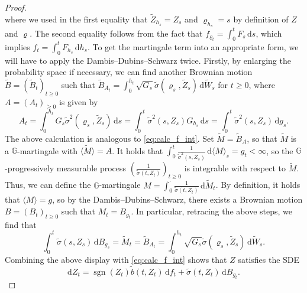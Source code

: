 \documentclass[11pt, a4paper]{article}
\theoremstyle{plain}
\theoremstyle{definition}
\theoremstyle{remark}
\numberwithin{equation}{section}
\DeclareMathOperator{\sgn}{sgn}
\renewcommand{\d}{\mathrm{d}}
\newcommand{\bb}[1]{\mathbb{#1}}
\begin{document}
\begin{proof}
\begin{equation}
\end{equation}
where we used in the first equality that $\tilde{Z}_{h_s} = Z_s$ and $\varrho_{h_s} = s$ by definition of $Z$ and $\varrho$. The second equality follows from the fact that $f_{\varrho_t} = \int_0^t F_s \, \d s$, which implies $f_t = \int_0^t F_{h_s} \, \d h_s$. To get the martingale term into an appropriate form, we will have to apply the Dambis--Dubins--Schwarz twice. Firstly, by enlarging the probability space if necessary, we can find another Brownian motion $\tilde{B} = (\tilde{B}_t)_{t \geq 0}$ such that $\tilde{B}_{A_t} = \int_0^{h_t} \sqrt{G_s} \tilde{\sigma}(\varrho_s, \tilde{Z}_s) \, \d \tilde{W}_s$ for $t \geq 0$, where $A = (A_t)_{\geq 0}$ is given by
\begin{equation*}
    A_t = \int_0^{h_t} G_s \tilde{\sigma}^2(\varrho_s, \tilde{Z}_s) \, \d s = \int_0^t \tilde{\sigma}^2(s, Z_s) G_{h_s} \, \d s = \int_0^t \tilde{\sigma}^2(s, Z_s) \, \d g_s.
\end{equation*}
The above calculation is analogous to \eqref{eq:calc_f_int}. Set $\tilde{M} = \tilde{B}_A$, so that $\tilde{M}$ is a $\bb{G}$-martingale with $\langle \tilde{M}\rangle = A$. It holds that $\int_0^t \frac{1}{\tilde{\sigma}^2(s, Z_s)} \, \d \langle M\rangle_s = g_t < \infty$, so the $\bb{G}$-progressively measurable process $(\frac{1}{\tilde{\sigma}(t, Z_t)})_{t \geq 0}$ is integrable with respect to $\tilde{M}$. Thus, we can define the $\bb{G}$-martingale $M = \int_0^{\cdot} \frac{1}{\tilde{\sigma}(t, Z_t)} \, \d \tilde{M}_t$. By definition, it holds that $\langle M\rangle = g$, so by the Dambis--Dubins--Schwarz, there exists a Brownian motion $B = (B_t)_{t \geq 0}$ such that $M_t = B_{g_t}$. In particular, retracing the above steps, we find that
\begin{equation*} 
    \int_0^t \tilde{\sigma}(s, Z_s) \, \d B_{g_s} = \tilde{M}_t = \tilde{B}_{A_t} = \int_0^{h_t} \sqrt{G_s} \tilde{\sigma}(\varrho_s, \tilde{Z}_s) \, \d \tilde{W}_s.
\end{equation*}
Combining the above display with \eqref{eq:calc_f_int} shows that $Z$ satisfies the SDE
\begin{equation*}
    \d Z_t = \sgn(Z_t) \tilde{b}(t, Z_t) \, \d f_t + \tilde{\sigma}(t, Z_t) \, \d B_{g_t}.
\end{equation*}


\end{proof}
\end{document}
